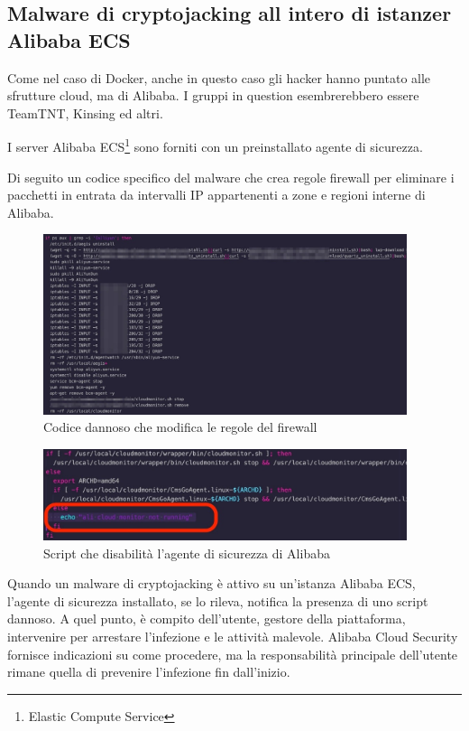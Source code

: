 \documentclass[12pt,a4paper]{article}
\begin{document}
\subsection{Malware di cryptojacking all intero di istanzer Alibaba ECS}
Come nel caso di Docker, anche in questo caso gli hacker hanno puntato alle
sfrutture cloud, ma di Alibaba. I gruppi in question esembrerebbero essere
TeamTNT, Kinsing ed altri.

I server Alibaba ECS\footnote{Elastic Compute Service} sono forniti con un
preinstallato agente di sicurezza.  

Di seguito un codice specifico del malware che crea regole firewall per
eliminare i pacchetti in entrata da intervalli IP appartenenti a zone e regioni
interne di Alibaba.

\begin{figure}[ht]
    \centering
    \includegraphics[width=0.95\textwidth]{./images/alibaba_firewall.png}
    \caption{Codice dannoso che modifica le regole del firewall}
    \label{fig:alibaba_firewall}
\end{figure}

\begin{figure}[ht]
    \centering
    \includegraphics[width=0.95\textwidth]{./images/alibaba_agent_disable.png}
    \caption{Script che disabilità l'agente di sicurezza di Alibaba}
    \label{fig:alibaba_agent}
\end{figure}

Quando un malware di cryptojacking è attivo su un'istanza Alibaba ECS, l'agente
di sicurezza installato, se lo rileva, notifica la presenza di uno script
dannoso. A quel punto, è compito dell'utente, gestore della piattaforma,
intervenire per arrestare l'infezione e le attività malevole. Alibaba Cloud
Security fornisce indicazioni su come procedere, ma la responsabilità principale
dell'utente rimane quella di prevenire l'infezione fin dall'inizio.
\end{document}
